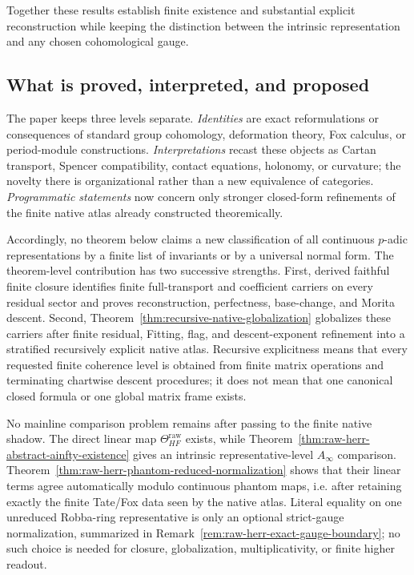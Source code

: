 \documentclass[11pt]{article}
\theoremstyle{definition}
\begin{document}
Together these results establish finite existence and substantial explicit reconstruction while keeping the distinction between the intrinsic representation and any chosen cohomological gauge.

\subsection{What is proved, interpreted, and proposed}

The paper keeps three levels separate.  \emph{Identities} are exact reformulations or consequences of standard group cohomology, deformation theory, Fox calculus, or period-module constructions.  \emph{Interpretations} recast these objects as Cartan transport, Spencer compatibility, contact equations, holonomy, or curvature; the novelty there is organizational rather than a new equivalence of categories.  \emph{Programmatic statements} now concern only stronger closed-form refinements of the finite native atlas already constructed theoremically.

Accordingly, no theorem below claims a new classification of all continuous $p$-adic representations by a finite list of invariants or by a universal normal form.  The theorem-level contribution has two successive strengths.  First, derived faithful finite closure identifies finite full-transport and coefficient carriers on every residual sector and proves reconstruction, perfectness, base-change, and Morita descent.  Second, Theorem~\ref{thm:recursive-native-globalization} globalizes these carriers after finite residual, Fitting, flag, and descent-exponent refinement into a stratified recursively explicit native atlas.  Recursive explicitness means that every requested finite coherence level is obtained from finite matrix operations and terminating chartwise descent procedures; it does not mean that one canonical closed formula or one global matrix frame exists.

No mainline comparison problem remains after passing to the finite native shadow.  The direct linear map $\Theta_{HF}^{\mathrm{raw}}$ exists, while Theorem~\ref{thm:raw-herr-abstract-ainfty-existence} gives an intrinsic representative-level $A_\infty$ comparison.  Theorem~\ref{thm:raw-herr-phantom-reduced-normalization} shows that their linear terms agree automatically modulo continuous phantom maps, i.e. after retaining exactly the finite Tate/Fox data seen by the native atlas.  Literal equality on one unreduced Robba-ring representative is only an optional strict-gauge normalization, summarized in Remark~\ref{rem:raw-herr-exact-gauge-boundary}; no such choice is needed for closure, globalization, multiplicativity, or finite higher readout.
\end{document}
